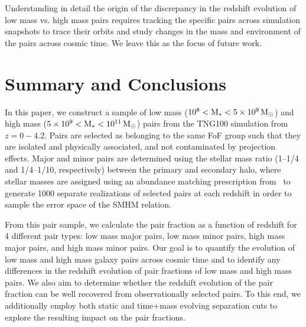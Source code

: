 \documentclass[twocolumn]{aastex631}
\begin{document}
    Understanding in detail the origin of the discrepancy in the redshift evolution of low mass vs. high mass pairs requires tracking the specific pairs across simulation snapshots to trace their orbits and study changes in the mass and environment of the pairs across cosmic time.  
    We leave this as the focus of future work.

\section{Summary and Conclusions}\label{sec:summary}
In this paper, we construct a sample of low mass ($\rm 10^8<M_*<5\times10^9\,\mathrm{M}_\odot$) and high mass ($\rm 5\times10^9<M_*<10^{11}\,\mathrm{M}_\odot$) pairs from the TNG100 simulation from $z=0-4.2$. Pairs are selected as belonging to the same FoF group such that they are isolated and physically associated, and not contaminated by projection effects.
Major and minor pairs are determined using the stellar mass ratio (1--1/4 and 1/4--1/10, respectively) between the primary and secondary halo, where stellar masses are assigned using an abundance matching prescription from~\cite{Moster2013} to generate 1000 separate realizations of selected pairs at each redshift in order to sample the error space of the SMHM relation.

From this pair sample, we calculate the pair fraction as a function of redshift for 4 different pair types: low mass major pairs, low mass minor pairs, high mass major pairs, and high mass minor pairs. 
Our goal is to quantify the evolution of low mass and high mass galaxy pairs across cosmic time and to identify any differences in the redshift evolution of pair fractions of low mass and high mass pairs.
We also aim to determine whether the redshift evolution of the pair fraction can be well recovered from observationally selected pairs. 
To this end, we additionally employ both static and time+mass evolving separation cuts to explore the resulting impact on the pair fractions.
\end{document}
